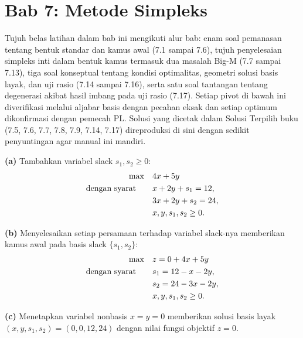 \section{Bab 7: Metode Simpleks}

Tujuh belas latihan dalam bab ini mengikuti alur bab: enam soal pemanasan tentang
bentuk standar dan kamus awal (7.1 sampai 7.6), tujuh penyelesaian simpleks inti
dalam bentuk kamus termasuk dua masalah Big-M (7.7 sampai 7.13), tiga
soal konseptual tentang kondisi optimalitas, geometri solusi basis
layak, dan uji rasio (7.14 sampai 7.16), serta satu soal tantangan tentang
degenerasi akibat hasil imbang pada uji rasio (7.17). Setiap pivot di bawah ini diverifikasi melalui
aljabar basis dengan pecahan eksak dan setiap optimum dikonfirmasi dengan pemecah
PL. Solusi yang dicetak dalam Solusi Terpilih buku (7.5, 7.6, 7.7,
7.8, 7.9, 7.14, 7.17) direproduksi di sini dengan sedikit penyuntingan agar
manual ini mandiri.


\textbf{(a)} Tambahkan variabel slack $s_1, s_2 \geq 0$:
\[
\begin{aligned}
\max \quad & 4x + 5y \\
\mbox{dengan syarat}\quad \quad & x + 2y + s_1 = 12, \\
& 3x + 2y + s_2 = 24, \\
& x, y, s_1, s_2 \geq 0.
\end{aligned}
\]

\textbf{(b)} Menyelesaikan setiap persamaan terhadap variabel slack-nya memberikan kamus awal
pada basis slack $\{s_1, s_2\}$:
\[
\begin{aligned}
\max \quad & z = 0 + 4x + 5y \\
\mbox{dengan syarat}\quad \quad & s_1 = 12 - x - 2y, \\
& s_2 = 24 - 3x - 2y, \\
& x, y, s_1, s_2 \geq 0.
\end{aligned}
\]

\textbf{(c)} Menetapkan variabel nonbasis $x = y = 0$ memberikan solusi basis
layak $(x, y, s_1, s_2) = (0, 0, 12, 24)$ dengan nilai fungsi objektif
$z = 0$.

